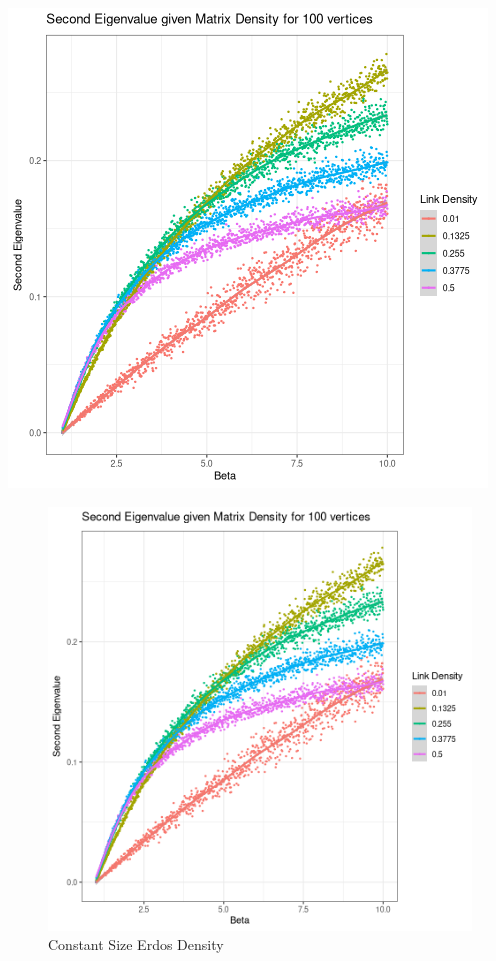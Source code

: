 \documentclass[11pt]{report}
\begin{document}
\begin{center}
\includegraphics[width=.9\linewidth]{media/constant_size_erdos_density.png}
\end{center}

\begin{figure}[htbp]
\centering
\includegraphics[width=12cm]{media/constant_size_erdos_density.png}
\caption{\label{constant_size_erdos_density}Constant Size Erdos Density}
\end{figure}
\end{document}
